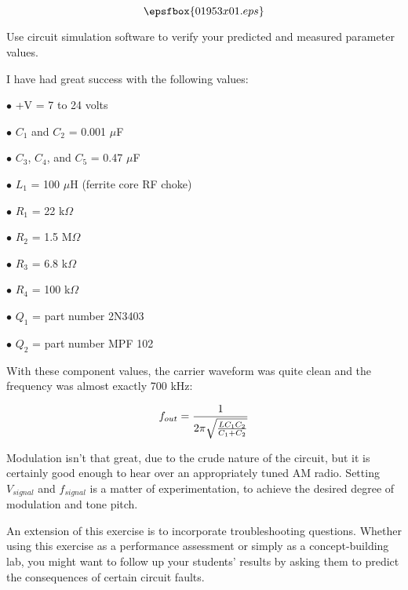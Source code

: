 

$$\epsfbox{01953x01.eps}$$

\vfil \eject






Use circuit simulation software to verify your predicted and measured parameter values.







I have had great success with the following values:

\medskip
\item{$\bullet$} +V = 7 to 24 volts
\item{$\bullet$} $C_1$ and $C_2$ = 0.001 $\mu$F
\item{$\bullet$} $C_3$, $C_4$, and $C_5$ = 0.47 $\mu$F
\item{$\bullet$} $L_1$ = 100 $\mu$H (ferrite core RF choke)
\item{$\bullet$} $R_1$ = 22 k$\Omega$
\item{$\bullet$} $R_2$ = 1.5 M$\Omega$
\item{$\bullet$} $R_3$ = 6.8 k$\Omega$
\item{$\bullet$} $R_4$ = 100 k$\Omega$
\item{$\bullet$} $Q_1$ = part number 2N3403
\item{$\bullet$} $Q_2$ = part number MPF 102
\medskip

With these component values, the carrier waveform was quite clean and the frequency was almost exactly 700 kHz:

$$f_{out} = {1 \over {2 \pi \sqrt{L C_1 C_2 \over C_1 + C_2}}}$$

Modulation isn't that great, due to the crude nature of the circuit, but it is certainly good enough to hear over an appropriately tuned AM radio.  Setting $V_{signal}$ and $f_{signal}$ is a matter of experimentation, to achieve the desired degree of modulation and tone pitch.

An extension of this exercise is to incorporate troubleshooting questions.  Whether using this exercise as a performance assessment or simply as a concept-building lab, you might want to follow up your students' results by asking them to predict the consequences of certain circuit faults.





